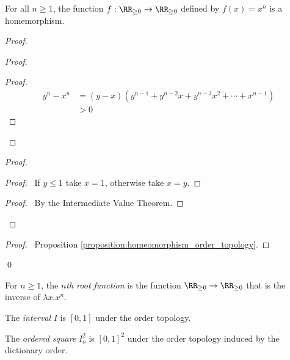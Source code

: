 \begin{proposition}
    For all $n \geq 1$, the function $f : \RR_{\geq 0} \rightarrow \RR_{\geq 0}$ defined by $f(x) = x^n$ is a homemorphism.
\end{proposition}

\begin{proof}
    \pf
    \begin{proof}
        \begin{proof}
            \begin{align*}
                y^n - x^n & = (y - x)(y^{n-1} + y^{n-2}x + y^{n-3}x^2 + \cdots + x^{n-1}) \\
                & > 0
            \end{align*}
        \end{proof}
    \end{proof}
    \begin{proof}
        \begin{proof}
            \pf\ If $y \leq 1$ take $x = 1$, otherwise take $x = y$.
        \end{proof}
        \begin{proof}
            \pf\ By the Intermediate Value Theorem.
        \end{proof}
    \end{proof}
    \qedstep
    \begin{proof}
        \pf\ Proposition \ref{proposition:homeomorphism_order_topology}.
    \end{proof}
    \qed
\end{proof}

\begin{definition}
    For $n \geq 1$, the \emph{$n$th root function} is the function $\RR_{\geq 0} \rightarrow \RR_{\geq 0}$ that is the inverse of $\lambda x.x^n$.
\end{definition}

\begin{definition}[Interval]
    The \emph{interval} $I$ is $[0,1]$ under the order topology.
\end{definition}

\begin{definition}
    The \emph{ordered square} $I_o^2$ is $[0,1]^2$ under the order topology induced by the dictionary order.
\end{definition}

